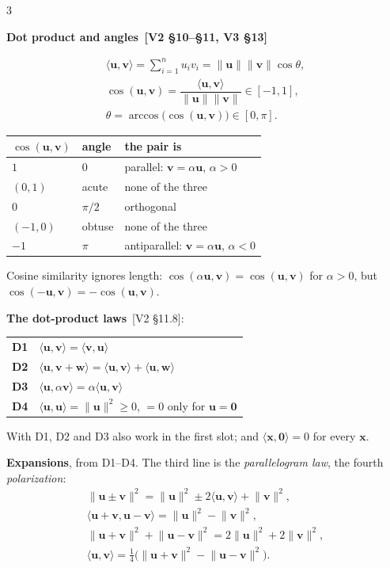 \documentclass[8pt]{extarticle}
\newcommand{\sub}[1]{\par\vspace{3pt}\noindent
  {\color{RoyalBlue}\bfseries\sffamily #1}\par\vspace{0.5pt}}
\newcommand{\src}[1]{{\color{gray}\,[#1]}}
\newcommand{\vc}[1]{\mathbf{#1}}
\newcommand{\norm}[1]{\lVert #1\rVert}
\newcommand{\ip}[2]{\langle #1,#2\rangle}
\begin{document}
\begin{multicols*}{3}
\sub{2.3\enspace Dot product and angles \src{V2 \S10--\S11, V3 \S13}}
\begin{gather*}
  \ip{\vc{u}}{\vc{v}}=\textstyle\sum_{i=1}^{n}u_iv_i
  =\norm{\vc{u}}\norm{\vc{v}}\cos\theta,\\
  \cos(\vc{u},\vc{v})=\dfrac{\ip{\vc{u}}{\vc{v}}}{\norm{\vc{u}}\norm{\vc{v}}}
  \in[-1,1],\\
  \theta=\arccos\bigl(\cos(\vc{u},\vc{v})\bigr)\in[0,\pi].
\end{gather*}
{\setlength{\tabcolsep}{4pt}%
\begin{tabular}{@{}l l l@{}}
\toprule
$\cos(\vc{u},\vc{v})$ & angle & the pair is \\
\midrule
$1$     & $0$           & parallel: $\vc{v}=\alpha\vc{u}$, $\alpha>0$ \\
$(0,1)$ & acute         & none of the three \\
$0$     & $\pi/2$       & orthogonal \\
$(-1,0)$& obtuse        & none of the three \\
$-1$    & $\pi$         & antiparallel: $\vc{v}=\alpha\vc{u}$, $\alpha<0$ \\
\bottomrule
\end{tabular}}

\smallskip
Cosine similarity ignores length:
$\cos(\alpha\vc{u},\vc{v})=\cos(\vc{u},\vc{v})$ for $\alpha>0$, but
$\cos(-\vc{u},\vc{v})=-\cos(\vc{u},\vc{v})$.

\textbf{The dot-product laws} \src{V2 \S11.8}:

\begin{tabular}{@{}l l@{}}
\textbf{D1} & $\ip{\vc{u}}{\vc{v}}=\ip{\vc{v}}{\vc{u}}$ \\
\textbf{D2} & $\ip{\vc{u}}{\vc{v}+\vc{w}}=\ip{\vc{u}}{\vc{v}}+\ip{\vc{u}}{\vc{w}}$ \\
\textbf{D3} & $\ip{\vc{u}}{\alpha\vc{v}}=\alpha\ip{\vc{u}}{\vc{v}}$ \\
\textbf{D4} & $\ip{\vc{u}}{\vc{u}}=\norm{\vc{u}}^{2}\ge0$, $=0$ only for
              $\vc{u}=\vc{0}$ \\
\end{tabular}

\smallskip
With D1, D2 and D3 also work in the first slot; and
$\ip{\vc{x}}{\vc{0}}=0$ for every $\vc{x}$.

\textbf{Expansions}, from D1--D4. The third line is the
\emph{parallelogram law}, the fourth \emph{polarization}:
\begin{gather*}
  \norm{\vc{u}\pm\vc{v}}^{2}
  =\norm{\vc{u}}^{2}\pm2\ip{\vc{u}}{\vc{v}}+\norm{\vc{v}}^{2},\\
  \ip{\vc{u}+\vc{v}}{\vc{u}-\vc{v}}=\norm{\vc{u}}^{2}-\norm{\vc{v}}^{2},\\
  \norm{\vc{u}+\vc{v}}^{2}+\norm{\vc{u}-\vc{v}}^{2}
  =2\norm{\vc{u}}^{2}+2\norm{\vc{v}}^{2},\\
  \ip{\vc{u}}{\vc{v}}
  =\tfrac14\bigl(\norm{\vc{u}+\vc{v}}^{2}-\norm{\vc{u}-\vc{v}}^{2}\bigr).
\end{gather*}


\end{multicols*}
\end{document}
